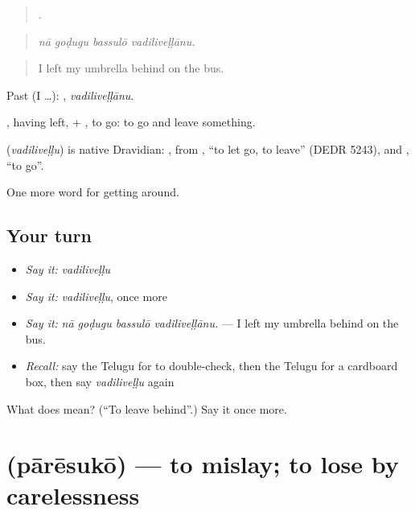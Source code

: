 \begin{quote}
   .
\end{quote}

\begin{quote}
\emph{nā goḍugu bassulō vadiliveḷḷānu.}
\end{quote}

\begin{quote}
I left my umbrella behind on the bus.
\end{quote}

Past (I …): , \emph{vadiliveḷḷānu}.

, having left, + , to go: to go and leave something.

\begin{cousinweb}
\textbf{} (\emph{vadiliveḷḷu}) is native Dravidian: , from , \textquotedblleft{}to let go, to leave\textquotedblright{} (DEDR 5243), and , \textquotedblleft{}to go\textquotedblright{}.
\end{cousinweb}

\begin{grammarlens}[title={What you've built}]
One more word for getting around.
\end{grammarlens}

\subsection*{Your turn}
\begin{itemize}
\raggedright
  \item \emph{Say it:} \emph{vadiliveḷḷu}
  \item \emph{Say it:} \emph{vadiliveḷḷu}, once more
  \item \emph{Say it:} \emph{nā goḍugu bassulō vadiliveḷḷānu.} — I left my umbrella behind on the bus.
  \item \emph{Recall:} say the Telugu for to double-check, then the Telugu for a cardboard box, then say \emph{vadiliveḷḷu} again
\end{itemize}

\begin{tcolorbox}[breakable,colback=teal!4,colframe=teal!35!black,title={Before you move on}]
What does  mean? (\textquotedblleft{}To leave behind\textquotedblright{}.) Say it once more.
\end{tcolorbox}
\section[\texorpdfstring{\te{పారేసుకో} (pārēsukō)}{పారేసుకో (pārēsukō)}]{ (pārēsukō) — to mislay; to lose by carelessness}

